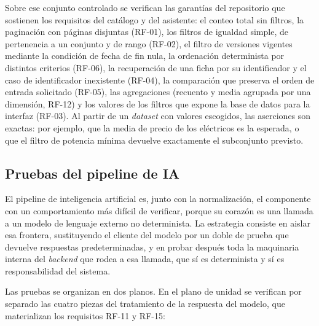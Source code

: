 Sobre ese conjunto controlado se verifican las garantías del repositorio que
sostienen los requisitos del catálogo y del asistente: el conteo total sin
filtros, la paginación con páginas disjuntas (RF-01), los filtros de igualdad
simple, de pertenencia a un conjunto y de rango (RF-02), el filtro de versiones
vigentes mediante la condición de fecha de fin nula, la ordenación determinista
por distintos criterios (RF-06), la recuperación de una ficha por su
identificador y el caso de identificador inexistente (RF-04), la comparación que
preserva el orden de entrada solicitado (RF-05), las agregaciones (recuento y
media agrupada por una dimensión, RF-12) y los valores de los filtros que expone
la base de datos para la interfaz (RF-03). Al partir de un \emph{dataset} con
valores escogidos, las aserciones son exactas: por ejemplo, que la media de
precio de los eléctricos es la esperada, o que el filtro de potencia mínima
devuelve exactamente el subconjunto previsto.

\subsection{Pruebas del pipeline de IA}
\label{sec:test-pipeline}

El pipeline de inteligencia artificial es, junto con la normalización, el
componente con un comportamiento más difícil de verificar, porque su corazón es
una llamada a un modelo de lenguaje externo no determinista. La estrategia
consiste en aislar esa frontera, sustituyendo el cliente del modelo por un doble
de prueba que devuelve respuestas predeterminadas, y en probar después toda la
maquinaria interna del \emph{backend} que rodea a esa llamada, que sí es
determinista y sí es responsabilidad del sistema.

Las pruebas se organizan en dos planos. En el plano de unidad se verifican por
separado las cuatro piezas del tratamiento de la respuesta del modelo, que
materializan los requisitos RF-11 y RF-15:

